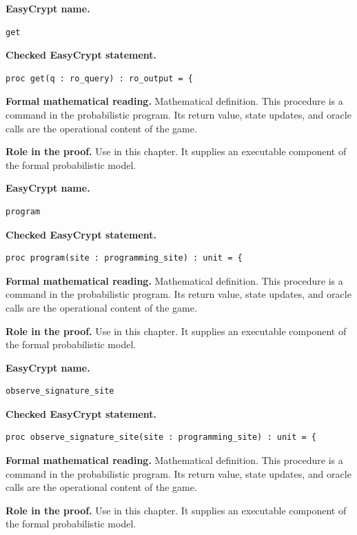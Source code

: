 \begin{formaldefinition}
\noindent\textbf{EasyCrypt name.}
\begin{lstlisting}[language=EasyCrypt,basicstyle=\ttfamily\scriptsize]
get
\end{lstlisting}
\noindent\textbf{Checked EasyCrypt statement.}
\begin{lstlisting}[language=EasyCrypt,basicstyle=\ttfamily\scriptsize]
proc get(q : ro_query) : ro_output = {
\end{lstlisting}
\noindent\textbf{Formal mathematical reading.}
Mathematical definition. This procedure is a command in the probabilistic program.  Its return value, state updates, and oracle calls are the operational content of the game.

\noindent\textbf{Role in the proof.}
Use in this chapter. It supplies an executable component of the formal probabilistic model.

\end{formaldefinition}

\begin{formaldefinition}
\noindent\textbf{EasyCrypt name.}
\begin{lstlisting}[language=EasyCrypt,basicstyle=\ttfamily\scriptsize]
program
\end{lstlisting}
\noindent\textbf{Checked EasyCrypt statement.}
\begin{lstlisting}[language=EasyCrypt,basicstyle=\ttfamily\scriptsize]
proc program(site : programming_site) : unit = {
\end{lstlisting}
\noindent\textbf{Formal mathematical reading.}
Mathematical definition. This procedure is a command in the probabilistic program.  Its return value, state updates, and oracle calls are the operational content of the game.

\noindent\textbf{Role in the proof.}
Use in this chapter. It supplies an executable component of the formal probabilistic model.

\end{formaldefinition}

\begin{formaldefinition}
\noindent\textbf{EasyCrypt name.}
\begin{lstlisting}[language=EasyCrypt,basicstyle=\ttfamily\scriptsize]
observe_signature_site
\end{lstlisting}
\noindent\textbf{Checked EasyCrypt statement.}
\begin{lstlisting}[language=EasyCrypt,basicstyle=\ttfamily\scriptsize]
proc observe_signature_site(site : programming_site) : unit = {
\end{lstlisting}
\noindent\textbf{Formal mathematical reading.}
Mathematical definition. This procedure is a command in the probabilistic program.  Its return value, state updates, and oracle calls are the operational content of the game.

\noindent\textbf{Role in the proof.}
Use in this chapter. It supplies an executable component of the formal probabilistic model.

\end{formaldefinition}

